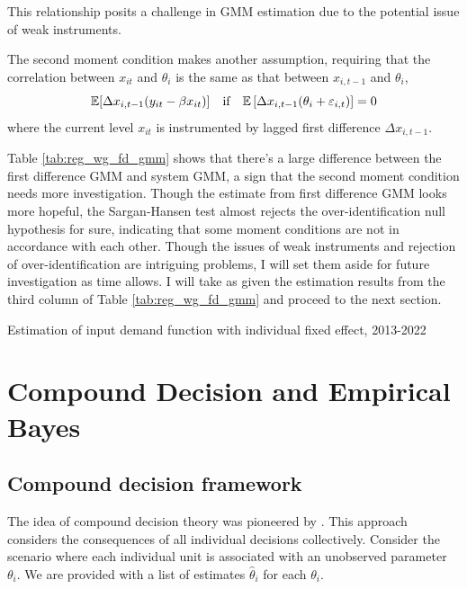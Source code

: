 \documentclass[12pt]{article}
\begin{document}
This relationship posits a challenge in GMM estimation due to the potential
issue of weak instruments.

The second moment condition makes another assumption, requiring that the
correlation between $x_{it}$ and $\theta_i$ is the same as that between
$x_{i,t-1}$ and $\theta_i$,
\begin{equation*}
    \mathbb{E}[\Delta x_{i,t-1}(y_{it}-\beta x_{it})] \quad \text{if}\quad \mathbb{E}\left[\Delta x_{i,t-1}(\theta_i+\varepsilon_{i,t})\right]=0
\end{equation*} where the current level $x_{it}$ is instrumented by lagged first difference $\Delta x_{i,t-1}$.

Table \ref{tab:reg_wg_fd_gmm} shows that there's a large difference between the
first difference GMM and system GMM, a sign that the second moment condition
needs more investigation. Though the estimate from first difference GMM looks
more hopeful, the Sargan-Hansen test almost rejects the over-identification
null hypothesis for sure, indicating that some moment conditions are not in
accordance with each other. Though the issues of weak instruments and rejection
of over-identification are intriguing problems, I will set them aside for
future investigation as time allows. I will take as given the estimation
results from the third column of Table \ref{tab:reg_wg_fd_gmm} and proceed to
the next section.

\begin{table}
    
    \caption{Estimation of input demand function with individual fixed effect, 2013-2022}
    \label{tab:reg_wg_fd_gmm}
\end{table}

%     

\section{Compound Decision and Empirical Bayes}

\subsection{Compound decision framework}
The idea of compound decision theory was pioneered by
\citet{robbins1956empirical}. This approach considers the consequences of all
individual decisions collectively. Consider the scenario where each individual
unit is associated with an unobserved parameter \( \theta_i \). We are provided
with a list of estimates \( \hat{\theta}_i \) for each \( \theta_i \).
\end{document}
